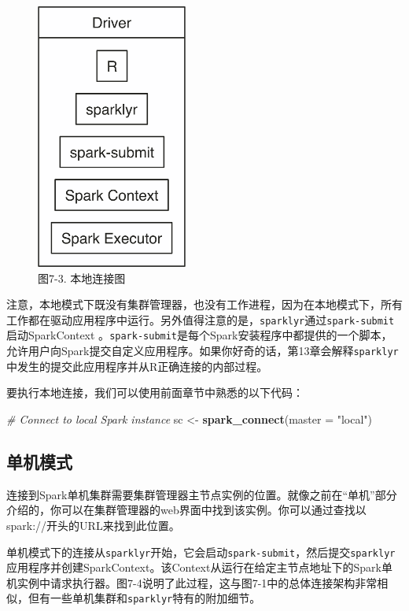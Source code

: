 \documentclass[
]{article}
\newenvironment{Shaded}{\begin{snugshade}}{\end{snugshade}}
\newcommand{\CommentTok}[1]{\textcolor[rgb]{0.56,0.35,0.01}{\textit{#1}}}
\newcommand{\DataTypeTok}[1]{\textcolor[rgb]{0.13,0.29,0.53}{#1}}
\newcommand{\KeywordTok}[1]{\textcolor[rgb]{0.13,0.29,0.53}{\textbf{#1}}}
\newcommand{\NormalTok}[1]{#1}
\newcommand{\StringTok}[1]{\textcolor[rgb]{0.31,0.60,0.02}{#1}}
\begin{document}
\begin{figure}
\centering
\includegraphics{figures/7_3.png}
\caption{图7-3. 本地连接图}
\end{figure}

注意，本地模式下既没有集群管理器，也没有工作进程，因为在本地模式下，所有工作都在驱动应用程序中运行。另外值得注意的是，\texttt{sparklyr}通过\texttt{spark-submit}启动SparkContext
。\texttt{spark-submit}是每个Spark安装程序中都提供的一个脚本，允许用户向Spark提交自定义应用程序。如果你好奇的话，第13章会解释\texttt{sparklyr}中发生的提交此应用程序并从R正确连接的内部过程。

要执行本地连接，我们可以使用前面章节中熟悉的以下代码：

\begin{Shaded}
\begin{Highlighting}[]
\CommentTok{# Connect to local Spark instance}
\NormalTok{sc <-}\StringTok{ }\KeywordTok{spark_connect}\NormalTok{(}\DataTypeTok{master =} \StringTok{"local"}\NormalTok{)}
\end{Highlighting}
\end{Shaded}

\hypertarget{ux5355ux673aux6a21ux5f0f}{%
\subsection{单机模式}\label{ux5355ux673aux6a21ux5f0f}}

连接到Spark单机集群需要集群管理器主节点实例的位置。就像之前在``单机''部分介绍的，你可以在集群管理器的web界面中找到该实例。你可以通过查找以spark://开头的URL来找到此位置。

单机模式下的连接从\texttt{sparklyr}开始，它会启动\texttt{spark-submit}，然后提交\texttt{sparklyr}应用程序并创建SparkContext。该Context从运行在给定主节点地址下的Spark单机实例中请求执行器。图7-4说明了此过程，这与图7-1中的总体连接架构非常相似，但有一些单机集群和\texttt{sparklyr}特有的附加细节。
\end{document}
